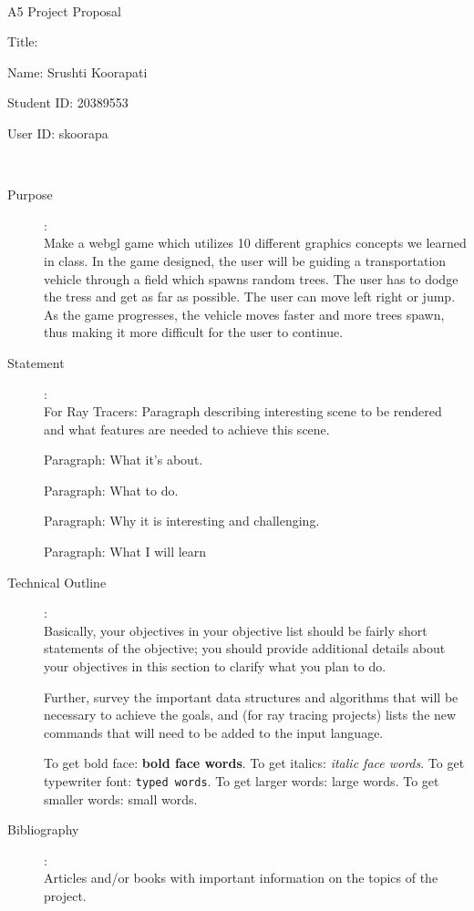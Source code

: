 \documentclass {article}
\begin{document}
~\vfill
\begin{center}
\Large

A5 Project Proposal

Title:

Name: Srushti Koorapati

Student ID: 20389553

User ID: skoorapa
\end{center}
\vfill ~\vfill~
\newpage
{}
\begin{description}
\item[Purpose]:\\
Make a webgl game which utilizes 10 different graphics concepts we learned in class. 
In the game designed, the user will be guiding a transportation vehicle through a field which spawns random trees. 
The user has to dodge the tress and get as far as possible. The user can move left right or jump. 
As the game progresses, the vehicle moves faster and more trees spawn, thus making it more difficult for the user to continue.

\item[Statement]:\\
For Ray Tracers: Paragraph describing interesting scene to be
rendered and what features are needed to achieve
this scene.

Paragraph: What it's about.

Paragraph: What to do.

Paragraph: Why it is interesting and challenging.

Paragraph: What I will learn

\item[Technical Outline]:\\
Basically, your objectives in your objective list should be fairly
short statements of the objective; you should provide additional
details about your objectives in this section to clarify what you
plan to do.

Further, survey the important data structures and algorithms that
will be necessary to achieve the goals, and (for ray tracing
projects) lists the new commands
that will need to be added to the input language.

To  get  bold face: {\bf bold face words}.  To get italics: {\it italic
face words}.  To  get typewriter font: {\tt typed words}.  To get
larger  words:  {\large large  words}.   To  get smaller words: 
{\small small words}.  

\item[Bibliography]:\\
Articles  and/or  books  with  important  information on the
topics of the project.

\end{description}
\newpage
\end{document}
